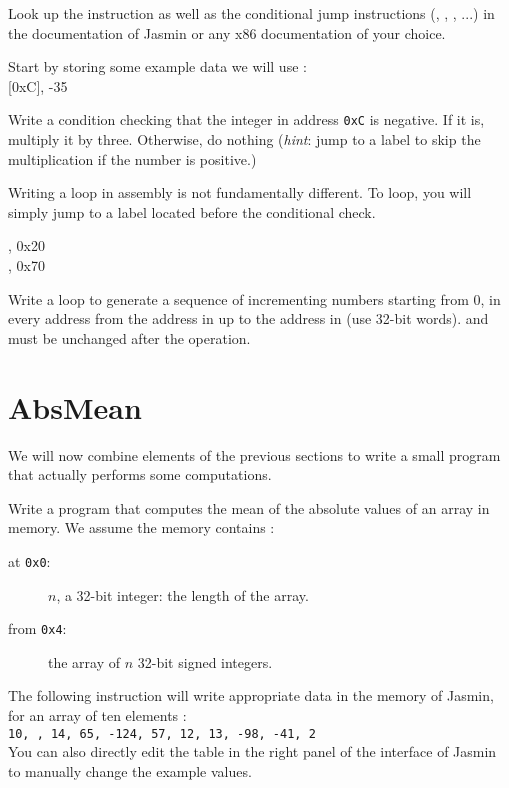 \documentclass{../../tp}
\begin{document}
Look up the  instruction as well as the conditional jump instructions (, , , ...) in the documentation of \textsf{Jasmin} or any x86 documentation of your choice.

\begin{instruction}
	
	Start by storing some example data we will use :\\
	
	{\ttfamily {} [0xC], -35 \\}
	
	Write a condition checking that the integer in address \texttt{0xC} is negative. If it is, multiply it by three. Otherwise, do nothing (\emph{hint}: jump to a label to skip the multiplication if the number is positive.)

\end{instruction}


Writing a loop in assembly is not fundamentally different. To loop, you will simply jump to a label located before the conditional check.

\begin{instruction}
	
	{\ttfamily {} , 0x20 \\
		 , 0x70 \\}	
	
Write a loop to generate a sequence of incrementing numbers 
starting from 0, in every address from the address in  
up to the address in  (use 32-bit words).
 and  must be unchanged after the operation.
\end{instruction}


\section{AbsMean}

We will now combine elements of the previous sections to write a small program that actually performs some computations. 

\begin{instruction}

Write a program that computes the mean of the absolute values of an array in memory.  
We assume the memory contains :
\begin{description}
	\item[at \texttt{0x0}:] $n$, a 32-bit integer: the length of the array.
	\item[from \texttt{0x4}:] the array of $n$ 32-bit signed integers.
\end{description}
 	 
The following instruction will write appropriate data in the memory of \textsf{Jasmin}, for an array of ten elements : \\

 \qquad \texttt{10, ,  14,  65, -124, 57, 12, 13, -98, -41, 2} \\
 
	  
You can also directly edit the table in the right panel of the interface of \textsf{Jasmin} to manually change the example values.
\end{instruction}
\end{document}
